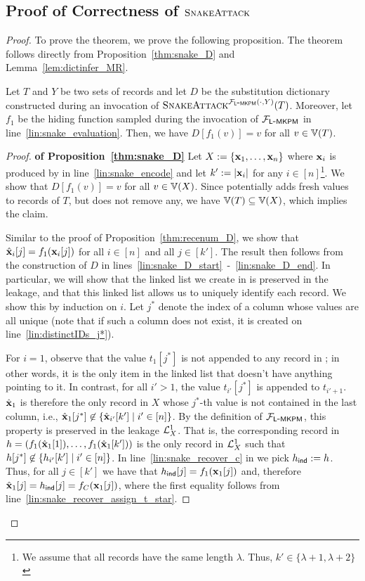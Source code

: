 \subsection{Proof of Correctness of $\textsc{SnakeAttack}$}
\label{sec:snakeattack:correctness}


\begin{proof}
	To prove the theorem, we prove the following proposition.
	The theorem follows directly from Proposition~\ref{thm:snake_D} and Lemma~\ref{lem:dictinfer_MR}.
\begin{proposition}
	\label{thm:snake_D}
	Let $T$ and $Y$ be two sets of records and let $D$ be the substitution dictionary
	constructed during an invocation of $\textsc{SnakeAttack}^{\mathcal{F}_{\mathsf{L\mbox{-}MKPM}}(\cdot, Y)}(T)$.
	Moreover, let $f_1$ be the hiding function sampled during the invocation of $\mathcal{F}_{\mathsf{L\mbox{-}MKPM}}$
	in line~\ref{lin:snake_evaluation}.
	Then, we have $D[f_1(v)] = v$ for all $v \in \Ispace[T]$.
\end{proposition}
\begin{proof} \textbf{of Proposition~\ref{thm:snake_D}}
	Let $X := \{\mathbf{x}_1, \dots, \mathbf{x}_n\}$ where $\mathbf{x}_i$ is produced by \snakeencodeUnique{} in line~\ref{lin:snake_encode}
	and let $k' := |\mathbf{x}_i|$ for any $i\in [n]$\footnote{We assume that all records have the same length $\lambda$.
	Thus, $k' \in \{\lambda + 1, \lambda+2\}$}.
	We show that $D[f_1(v)] = v$ for all $v \in \Ispace[X]$.
	Since \snakeattack{} potentially adds fresh values to records of $T$, but does not remove any, 
	we have $\Ispace[T]\subseteq\Ispace[X]$, which implies the claim.
	
	Similar to the proof of Proposition~\ref{thm:recenum_D}, we show that
	$\hat{\mathbf{x}}_i[j] = f_1(\mathbf{x}_i[j])$ for all $i\in[n]$ and all $j \in [k']$.
	The result then follows from the construction of $D$ in lines~\ref{lin:snake_D_start}~-~\ref{lin:snake_D_end}. 
	In particular, we will show that the linked list we create in \IdxToSeq{} is preserved in the leakage, 
	and that this linked list allows us to uniquely identify each record. 
	We show this by induction on $i$. 
	Let $j^*$ denote the index of a column whose values are all unique (note that if such a column does not exist, it is created on line~\ref{lin:distinctIDs_j*}).

	For $i = 1$, observe that the value $t_1[j^*]$ is not appended to any record in \snakeencodeUnique{}; 
	in other words, it is the only item in the linked list that doesn't have anything pointing to it.
	In contrast, for all $i' > 1$, the value $t_{i'}[j^*]$ is appended to $t_{i'+1}$.
	$\hat{\mathbf{x}}_1$ is therefore the only record in $X$ whose $j^*$-th value is not contained in the last column, 
	i.e., $\hat{\mathbf{x}}_1[j^*] \not \in \{\hat{\mathbf{x}}_{i'}[k'] \; | \; i'\in[n]\}$.
	By the definition of $\mathcal{F}_{\mathsf{L\mbox{-}MKPM}}$, this property is preserved in the leakage $\mathcal{L}^{1}_X$.
	That is, the corresponding record in $h = (f_1(\hat{\mathbf{x}}_1[1]), \dots, f_1(\hat{\mathbf{x}}_1[k']))$
	is the only record in $\mathcal{L}^{1}_X$ such that $h[j^*]\not\in\{h_{i'}[k'] \; | \; i' \in [n]\}$.
	In line~\ref{lin:snake_recover_c} in \snakerecoverUnique{} we pick $h_{\mathsf{ind}} := h$.
	Thus, for all $j \in [k']$ we have that $h_{\mathsf{ind}}[j] = f_1(\mathbf{x}_1[j])$
	and, therefore  $\hat{\mathbf{x}}_1[j] = h_{\mathsf{ind}}[j] = f_C(\mathbf{x}_1[j])$, where the first equality follows from line~\ref{lin:snake_recover_assign_t_star}.


\end{proof}
\end{proof}
